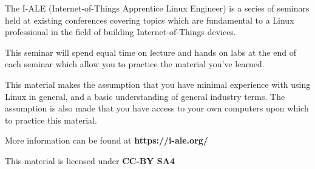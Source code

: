 \alecopyright

\par
The I-ALE (Internet-of-Things Apprentice Linux Engineer) is
a series of seminars held at existing conferences covering
topics which are fundamental to a Linux professional in
the field of building Internet-of-Things devices.

\par
This seminar will spend equal time on lecture and hands on
labs at the end of each seminar which allow you to practice
the material you've learned.

\begin{lfbox}
   This material makes the assumption that you have minimal
   experience with using Linux in general, and a basic
   understanding of general industry terms.
   The assumption is also made that you have access to your
   own computers upon which to practice this material.
\end{lfbox}

\par
More information can be found at \textbf{https://i-ale.org/}

\par
This material is licensed under \textbf{CC-BY SA4}
